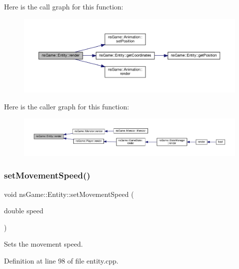 Here is the call graph for this function\+:\nopagebreak
\begin{figure}[H]
\begin{center}
\leavevmode
\includegraphics[width=350pt]{structns_game_1_1_entity_a4663cc85381acc9aaac120a85b6f24d0_cgraph}
\end{center}
\end{figure}
Here is the caller graph for this function\+:\nopagebreak
\begin{figure}[H]
\begin{center}
\leavevmode
\includegraphics[width=350pt]{structns_game_1_1_entity_a4663cc85381acc9aaac120a85b6f24d0_icgraph}
\end{center}
\end{figure}
\mbox{\label{structns_game_1_1_entity_a0254c30b6223caa723303266ad04e4cd}} 
\subsubsection{\texorpdfstring{set\+Movement\+Speed()}{setMovementSpeed()}}
{\footnotesize\ttfamily void ns\+Game\+::\+Entity\+::set\+Movement\+Speed (\begin{DoxyParamCaption}\item[{double}]{speed }\end{DoxyParamCaption})}



Sets the movement speed. 



Definition at line 98 of file entity.\+cpp.

